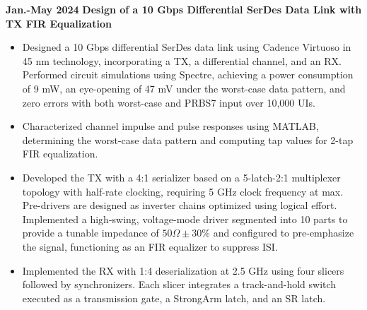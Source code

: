 \documentclass[11pt,a4paper,sans]{moderncv}
\begin{document}

\cventry
{\textnormal{\textbf{Jan.-May 2024}}}
{\textnormal{\textbf{Design of a 10 Gbps Differential SerDes Data Link with TX FIR Equalization}}}
{}{}{}
{
    \begin{itemize}
        \item Designed a 10 Gbps differential SerDes data link using Cadence Virtuoso in 45 nm technology, incorporating a TX, a differential channel, and an RX. Performed circuit simulations using Spectre, achieving a power consumption of 9 mW, an eye-opening of 47 mV under the worst-case data pattern, and zero errors with both worst-case and PRBS7 input over 10,000 UIs.
        \item Characterized channel impulse and pulse responses using MATLAB, determining the worst-case data pattern and computing tap values for 2-tap FIR equalization.
        \item Developed the TX with a 4:1 serializer based on a 5-latch-2:1 multiplexer topology with half-rate clocking, requiring 5 GHz clock frequency at max. Pre-drivers are designed as inverter chains optimized using logical effort. Implemented a high-swing, voltage-mode driver segmented into 10 parts to provide a tunable impedance of $50 \Omega \pm 30\%$ and configured to pre-emphasize the signal, functioning as an FIR equalizer to suppress ISI.
        \item Implemented the RX with 1:4 deserialization at 2.5 GHz using four slicers followed by synchronizers. Each slicer integrates a track-and-hold switch executed as a transmission gate, a StrongArm latch, and an SR latch.
    \end{itemize}
}


\end{document}
